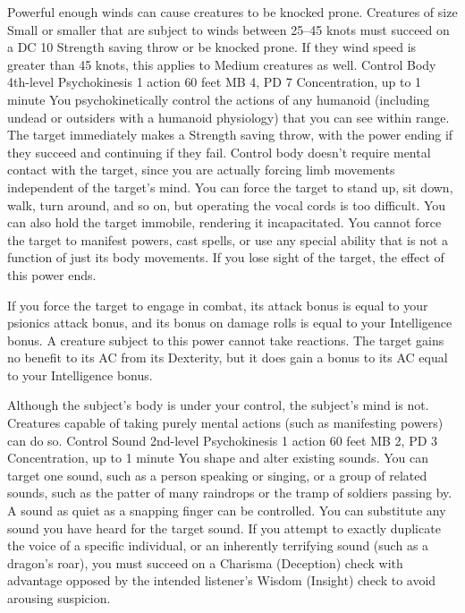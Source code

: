 Powerful enough winds can cause creatures to be knocked prone.
Creatures of size Small or smaller that are subject to winds
between 25--45 knots must succeed on a DC 10 Strength saving
throw or be knocked prone. If they wind speed is greater than
45 knots, this applies to Medium creatures as well.
\DndPowerHeader%
    {Control Body\label{pwr:control_body}}
    {4th-level Psychokinesis}
    {1 action}
    {60 feet}
    {MB 4, PD 7}
    {Concentration, up to 1 minute}
You psychokinetically control the actions
of any humanoid (including undead or outsiders with a humanoid
physiology) that you can see within range. The target immediately
makes a Strength saving throw, with the power ending if they
succeed and continuing if they fail. Control body doesn't
require mental contact with the target, since you are actually
forcing limb movements independent of the target's mind.
You can force the target to stand up, sit down, walk, turn
around, and so on, but operating the vocal cords is too difficult.
You can also hold the target immobile, rendering it incapacitated.
You cannot force the target to manifest powers, cast spells,
or use any special ability that is not a function of just
its body movements. If you lose sight of the target, the effect
of this power ends.

If you force the target to engage in combat, its attack bonus
is equal to your psionics attack bonus, and its bonus on damage
rolls is equal to your Intelligence bonus. A creature subject
to this power cannot take reactions. The target gains no benefit
to its AC from its Dexterity, but it does gain a bonus to
its AC equal to your Intelligence bonus.

Although the subject's body is under your control, the subject's
mind is not. Creatures capable of taking purely mental actions
(such as manifesting powers) can do so.
\DndPowerHeader%
    {Control Sound\label{pwr:control_sound}}
    {2nd-level Psychokinesis}
    {1 action}
    {60 feet}
    {MB 2, PD 3}
    {Concentration, up to 1 minute}
You shape and alter existing sounds. You
can target one sound, such as a person speaking or singing,
or a group of related sounds, such as the patter of many raindrops
or the tramp of soldiers passing by. A sound as quiet as a
snapping finger can be controlled. You can substitute any
sound you have heard for the target sound. If you attempt
to exactly duplicate the voice of a specific individual, or
an inherently terrifying sound (such as a dragon's roar),
you must succeed on a Charisma (Deception) check with advantage
opposed by the intended listener's Wisdom (Insight) check
to avoid arousing suspicion.

